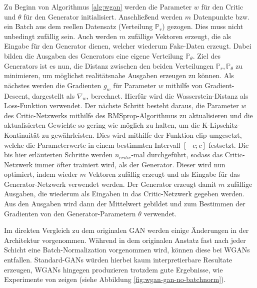 \documentclass{hsflensburg}
\begin{document}
  Zu Beginn von Algorithmus \ref{alg:wgan} werden die Parameter $w$ für den
  Critic und $\theta$ für den Generator initialisiert. Anschließend werden $m$
  Datenpunkte bzw. ein Batch aus dem reellen Datensatz (Verteilung
  $\mathbb{P}_r$) gezogen. Dies muss nicht unbedingt zufällig sein. Auch werden
  $m$ zufällige Vektoren erzeugt, die als Eingabe für den Generator dienen,
  welcher wiederum Fake-Daten erzeugt. Dabei bilden die Ausgaben des Generators
  eine eigene Verteilung $\mathbb{P}_\theta$. Ziel des Generators ist es nun,
  die Distanz zwischen den beiden Verteilungen $\mathbb{P}_r, \mathbb{P}_\theta$
  zu minimieren, um möglichst realitätsnahe Ausgaben erzeugen zu können. Als
  nächstes werden die Gradienten $g_w$ für Parameter $w$ mithilfe von
  Gradient-Descent, dargestellt als $\nabla_w$, berechnet. Hierfür wird die
  Wasserstein-Distanz als Loss-Funktion verwendet. Der nächste Schritt besteht
  daraus, die Parameter $w$ des Critic-Netzwerks mithilfe des
  RMSprop-Algorithmus zu aktualisieren und die aktualisierten Gewichte so gering
  wie möglich zu halten, um die K-Lipschitz-Kontinuität zu gewährleisten. Dies
  wird mithilfe der Funktion $\mathrm{clip}$ umgesetzt, welche die
  Parameterwerte in einem bestimmten Intervall $\left[-c; c\right]$ festsetzt.
  Die bis hier erläuterten Schritte werden $n_{critic}$-mal durchgeführt, sodass
  das Critic-Netzwerk immer öfter trainiert wird, als der Generator. Dieser wird
  nun optimiert, indem wieder $m$ Vektoren zufällig erzeugt und als Eingabe für
  das Generator-Netzwerk verwendet werden. Der Generator erzeugt damit $m$
  zufällige Ausgaben, die wiederum als Eingaben in das Critic-Netzwerk gegeben
  werden. Aus den Ausgaben wird dann der Mittelwert gebildet und zum Bestimmen
  der Gradienten von den Generator-Parametern $\theta$ verwendet.

  Im direkten Vergleich zu dem originalen GAN \cite{goodfellow2014generative}
  werden einige Änderungen in der Architektur vorgenommen. Während in dem
  originalen Anstatz fast nach jeder Schicht eine Batch-Normalization
  vorgenommen wird, können diese bei WGANs entfallen. Standard-GANs würden
  hierbei kaum interpretierbare Resultate erzeugen, WGANs hingegen produzieren
  trotzdem gute Ergebnisse, wie Experimente von \cite{arjovsky2017wasserstein}
  zeigen (siehe Abbildung \ref{fig:wgan-gan-no-batchnorm}).
\end{document}
